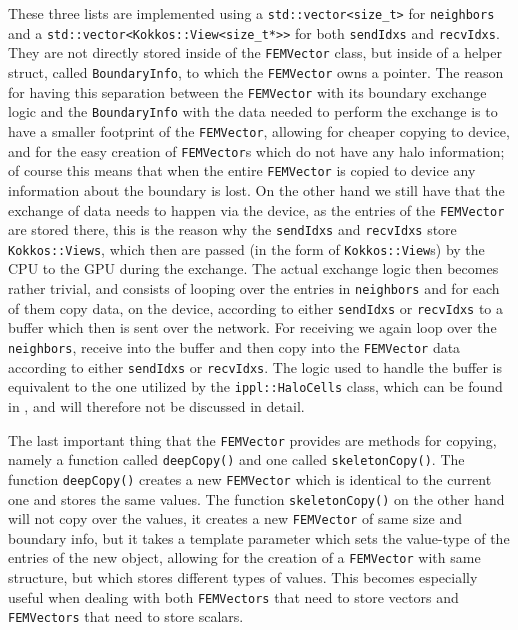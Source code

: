 These three lists are implemented using a \texttt{std::vector<size\_t>} for \texttt{neighbors} and a \texttt{std::vector<Kokkos::View<size\_t*>>} for both \texttt{sendIdxs} and \texttt{recvIdxs}. They are not directly stored inside of the \texttt{FEMVector} class, but inside of a helper struct, called \texttt{BoundaryInfo}, to which the \texttt{FEMVector} owns a pointer. The reason for having this separation between the \texttt{FEMVector} with its boundary exchange logic and the \texttt{BoundaryInfo} with the data needed to perform the exchange is to have a smaller footprint of the \texttt{FEMVector}, allowing for cheaper copying to device, and for the easy creation of \texttt{FEMVector}s which do not have any halo information; of course this means that when the entire \texttt{FEMVector} is copied to device any information about the boundary is lost. On the other hand we still have that the exchange of data needs to happen via the device, as the entries of the \texttt{FEMVector} are stored there, this is the reason why the \texttt{sendIdxs} and \texttt{recvIdxs} store \texttt{Kokkos::Views}, which then are passed (in the form of \texttt{Kokkos::View}s) by the CPU to the GPU during the exchange. The actual exchange logic then becomes rather trivial, and consists of looping over the entries in \texttt{neighbors} and for each of them copy data, on the device, according to either \texttt{sendIdxs} or \texttt{recvIdxs} to a buffer which then is sent over the network. For receiving we again loop over the \texttt{neighbors}, receive into the buffer and then copy into the \texttt{FEMVector} data according to either \texttt{sendIdxs} or \texttt{recvIdxs}. The logic used to handle the buffer is equivalent to the one utilized by the \texttt{ippl::HaloCells} class, which can be found in \cite{matthias_frey_2024_10878166}, and will therefore not be discussed in detail.\medskip

The last important thing that the \texttt{FEMVector} provides are methods for copying, namely a function called \texttt{deepCopy()} and one called \texttt{skeletonCopy()}. The function \texttt{deepCopy()} creates a new \texttt{FEMVector} which is identical to the current one and stores the same values. The function \texttt{skeletonCopy()} on the other hand will not copy over the values, it creates a new \texttt{FEMVector} of same size and boundary info, but it takes a template parameter which sets the value-type of the entries of the new object, allowing for the creation of a \texttt{FEMVector} with same structure, but which stores different types of values. This becomes especially useful when dealing with both \texttt{FEMVectors} that need to store vectors and \texttt{FEMVectors} that need to store scalars.\medskip

